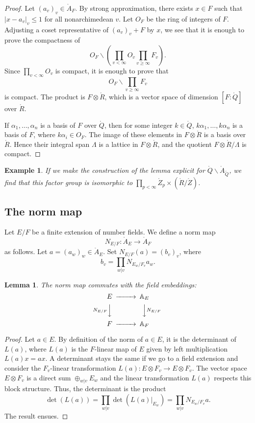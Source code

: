 \documentclass{amsart}
\newtheorem{lemma}[equation]{Lemma}
\newtheorem{example}[exercise]{Example}
\def\RR{\ring{R}}
\def\ZZ{\ring{Z}}
\def\QQ{\ring{Q}}
\def\AA{\ring{A}}
\begin{document}
\begin{proof}  Let $(a_v)_v \in \AA_F$.  By strong approximation, there
exists $x\in F$ such that $|x - a_v|_v \le 1$ for all nonarchimedean $v$.
Let $O_F$ be the ring of integers of $F$.
Adjusting a coset representative of $(a_v)_v + F$ by $x$, 
we see that it is enough to prove the
compactness of
\[
O_F\backslash (\prod_{v<\infty} O_v \prod _{v\ge\infty} F_v).
\]
Since $\prod_{v<\infty}  O_v$ is compact, it is enough to prove that
\[
O_F \backslash \prod_{v\ge\infty} F_v
\]
is compact.  The product is $F\otimes \ring{R}$, which is a vector space
of dimension $[F:\QQ]$ over $\RR$.

If $\alpha_1,\ldots,\alpha_n$ is a basis of $F$ over $\ring{Q}$, then
for some integer $k\in\ring{Q}$, $k\alpha_1,\ldots,k\alpha_n$ is a
basis of $F$, where $k\alpha_i\in O_F$.  The image of
these elements in $F\otimes \ring{R}$ is a basis over $\ring{R}$.  Hence their
integral span $\Lambda$ is a lattice in $F\otimes \ring{R}$, and
the quotient $F\otimes \RR/\Lambda$ is compact.
\end{proof}

\begin{example} If we make the construction of the lemma explicit for
  $\QQ\backslash \AA_\QQ$, we find that this factor group is
  isomorphic to $\prod_{p<\infty} \ZZ_p \times (\RR/\ZZ)$.
\end{example}

\subsection{The norm map}

Let $E/F$ be a finite extension of number fields.  We define a norm map
\[
N_{E/F} : \AA_E \to \AA_F
\]
as follows.  Let $a=(a_w)_w\in \AA_E$.  Set $N_{E/F}(a) = (b_v)_v$, where 
\[
b_v = \prod_{w|v} N_{E_w/F_v} a_w.
\]

\begin{lemma} The norm map commutes with the field embeddings:
\[
\begin{CD}
E @>>> \AA_E\\
@VN_{E/F}VV @VVN_{E/F}V \\
F @>>> \AA_F
\end{CD}
\]
\end{lemma}

\begin{proof}  Let $a\in E$.  By definition of the norm of $a\in E$, it is the
determinant of $L(a)$, where $L(a)$ is the $F$-linear map of $E$ given by
left multiplication $L(a)x = a x$.   A determinant stays the same if we go to a field
extension and consider the $F_v$-linear transformation $L(a):E\otimes F_v\to E\otimes F_v$.
The vector space $E\otimes F_v$ is a direct sum $\oplus_{w|v} E_w$ and the linear
transformation $L(a)$ respects this block structure.  Thus, the determinant is the product
\[
\det(L(a)) = \prod_{w|v}\det(L(a)|_{E_w}) = \prod_{w|v} N_{E_w/F_v} a.
\]
The result ensues.
\end{proof}
\end{document}

